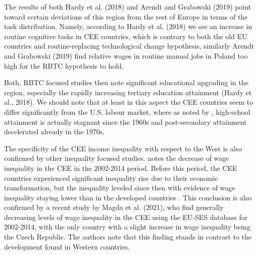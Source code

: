 \documentclass[11pt]{article}
\begin{document}
The results of both Hardy et al. (2018) and Arendt and Grabowski (2019) point toward certain deviations of this region from the rest of Europe in terms of the task distribution. Namely, according to Hardy et al. (2018) we see an increase in routine cognitive tasks in CEE countries, which is contrary to both the old EU countries and routine-replacing technological change hypothesis, similarly Arendt and Grabowski (2019) find relative wages in routine manual jobs in Poland too high for the RBTC hypothesis to hold. 

Both, RBTC focused studies then note significant educational upgrading in the region, especially the rapidly increasing tertiary education attainment (Hardy et al., 2018). We should note that at least in this aspect the CEE countries seem to differ significantly from the U.S. labour market, where as noted by \citet{acemoglu2012does}, high-school attainment is actually stagnant since the 1960s and post-secondary attainment decelerated already in the 1970s.

The specificity of the CEE income inequality with respect to the West is also confirmed by  other inequality focused studies. \citet{magda2021firms} notes the decrease of wage inequality in the CEE in the 2002-2014 period. Before this period, the CEE countries experienced significant inequality rise due to their economic transformation, but the inequality leveled since then \citep{tyrowicz2019wage} with evidence of wage inequality staying lower than in the developed countries \citep{mysikova2018personal}. This conclusion is also confirmed by a recent study by Magda et al. (2021), who find generally decreasing levels of wage inequality in the CEE using the EU-SES database for 2002-2014, with the only country with a slight increase in wage inequality being the Czech Republic. The authors note that this finding stands in contrast to the development found in Western countries.%
\end{document}
